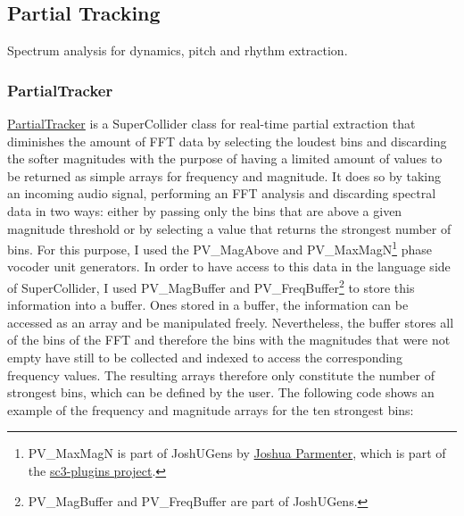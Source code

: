 \subsection{Partial Tracking}

Spectrum analysis for dynamics, pitch and rhythm extraction. 

\hypertarget{partrack}{}
\subsubsection{PartialTracker}

\href{http://github.com/freuben/FedeLib/blob/master/PartialTracking/PartialTracker.sc}{PartialTracker} is a SuperCollider class for real-time partial extraction that diminishes the amount of FFT data by selecting the loudest bins and discarding the softer magnitudes with the purpose of having a limited amount of values to be returned as simple arrays for frequency and magnitude. It does so by taking an incoming audio signal, performing an FFT analysis and discarding spectral data in two ways: either by passing only the bins that are above a given magnitude threshold or by selecting a value that returns the strongest number of bins. For this purpose, I used the PV\_MagAbove and PV\_MaxMagN\footnote{PV\_MaxMagN is part of JoshUGens by \href{http://www.realizedsound.net/josh/}{Joshua Parmenter}, which is part of the \href{http://sourceforge.net/projects/sc3-plugins/}{sc3-plugins project}.} phase vocoder unit generators. In order to have access to this data in the language side of SuperCollider, I used PV\_MagBuffer and PV\_FreqBuffer\footnote{PV\_MagBuffer and PV\_FreqBuffer are part of JoshUGens.} to store this information into a buffer. Ones stored in a buffer, the information can be accessed as an array and be manipulated freely. Nevertheless, the buffer stores all of the bins of the FFT and therefore the bins with the magnitudes that were not empty have still to be collected and indexed to access the corresponding frequency values. The resulting arrays therefore only constitute the number of strongest bins, which can be defined by the user. The following code shows an example of the frequency and magnitude arrays for the ten strongest bins:

